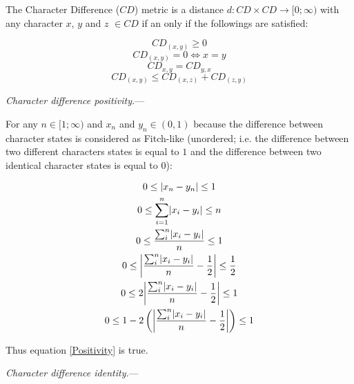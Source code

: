 \documentclass[12pt,letterpaper]{article}
\DeclarePairedDelimiter\abs{\lvert}{\rvert}%
\renewcommand{\subsection}[1]{%
\bigskip
\begin{center}
\begin{large}
\normalfont\itshape #1
\end{large}
\end{center}}
\renewcommand{\subsection}[1]{%
\vspace{2ex}
\noindent
\textit{#1.}---}
\begin{document}
The Character Difference ($CD$) metric is a distance $d: CD \times CD \rightarrow [0;\infty)$ with any character $x$, $y$ and $z$ $\in CD$ if an only if the followings are satisfied:

\begin{equation}
    \label{Positivity}
    CD_{(x,y)} \geq 0
\end{equation}
\begin{equation}
    \label{Identity}
    CD_{(x,y)} = 0 \Leftrightarrow x = y
\end{equation}
\begin{equation}
    \label{Equality}
    CD_{x,y} = CD_{y,x}
\end{equation}
\begin{equation}
    \label{Subadditivity}
    CD_{(x,y)} \leq CD_{(x,z)} + CD_{(z,y)}
\end{equation}


\subsection{Character difference positivity}

For any $n \in [1;\infty)$ and $x_{n}$ and $y_{n} \in (0,1)$ because the difference between character states is considered as Fitch-like (unordered; i.e. the difference between two different characters states is equal to $1$ and the difference between two identical character states is equal to $0$):

\begin{equation}
    \label{positive_demo}
    \begin{gathered}
    0 \leq  \abs{x_{n}-y_{n}} \leq 1\\
    0 \leq  \sum_{i=1}^{n}\abs{x_{i}-y_{i}} \leq n\\
    0 \leq  \frac{\sum_{i}^{n}\abs{x_{i}-y_{i}}}{n} \leq 1\\
    0 \leq  \abs*{\frac{\sum_{i}^{n}\abs{x_{i}-y_{i}}}{n}-\frac{1}{2}} \leq \frac{1}{2}\\
    0 \leq  2\abs*{\frac{\sum_{i}^{n}\abs{x_{i}-y_{i}}}{n}-\frac{1}{2}} \leq 1\\
    0 \leq  1 - 2\left(\abs*{\frac{\sum_{i}^{n}\abs{x_{i}-y_{i}}}{n}-\frac{1}{2}}\right) \leq 1\\
    \end{gathered}
\end{equation}

Thus equation \ref{Positivity} is true.

\subsection{Character difference identity}
\end{document}
